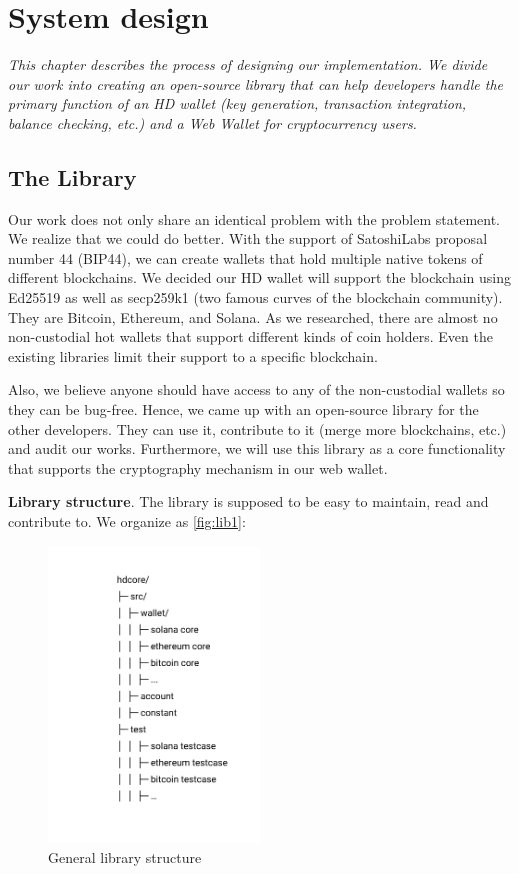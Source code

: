 \chapter{System design} \label{chap:System_desgin}
\textit{This chapter describes the process of designing our implementation. We divide our work into creating an open-source library that can help developers handle the primary function of an HD wallet (key generation, transaction integration, balance checking, etc.) and a Web Wallet for cryptocurrency users. }

\minitoc

\section{The Library}
Our work does not only share an identical problem with the problem statement. We realize that we could do better. With the support of SatoshiLabs proposal number 44 (BIP44), we can create wallets that hold multiple native tokens of different blockchains. We decided our HD wallet will support the blockchain using Ed25519 as well as secp259k1 (two famous curves of the blockchain community). They are Bitcoin, Ethereum, and Solana. As we researched, there are almost no non-custodial hot wallets that support different kinds of coin holders. Even the existing libraries limit their support to a specific blockchain.

Also, we believe anyone should have access to any of the non-custodial wallets so they can be bug-free. Hence, we came up with an open-source library for the other developers. They can use it, contribute to it (merge more blockchains, etc.) and audit our works. Furthermore, we will use this library as a core functionality that supports the cryptography mechanism in our web wallet.

\bigskip
{\textbf{Library structure}}. The library is supposed to be easy to maintain, read and contribute to. We organize as \autoref{fig:lib1}:

\begin{figure}[!ht]
    \centering
    \includegraphics[width=0.5\textwidth]{images/lib_struct.png}
    \caption[General library structure]{General library structure}
    \label{fig:lib1}
\end{figure}

